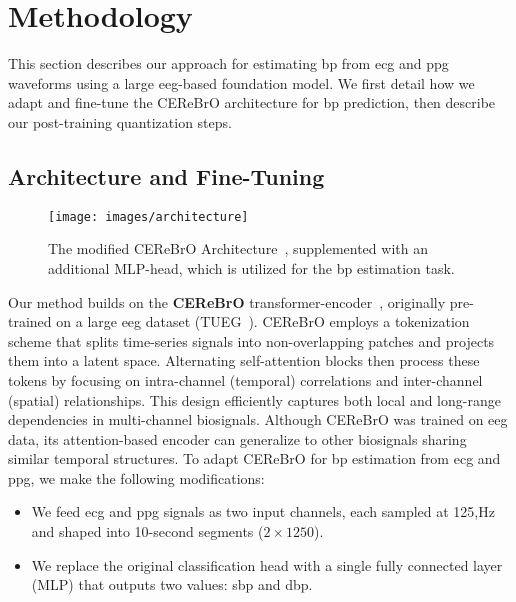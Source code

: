 \section{Methodology}\label{sec:method}

This section describes our approach for estimating \gls{bp} from \gls{ecg} and \gls{ppg} waveforms using a large \gls{eeg}-based foundation model. We first detail how we adapt and fine-tune the CEReBrO architecture for \gls{bp} prediction, then describe our post-training quantization steps.

\subsection{Architecture and Fine-Tuning}\label{subsec:model}

\begin{figure}[htp]
    \centering
    \texttt{[image: images/architecture]}
    \caption{The modified CEReBrO Architecture~\cite{CEReBrO}, supplemented with an additional MLP-head, which is utilized for the \gls{bp} estimation task.} 
    \vspace{-0.6cm}
    \label{fig:cerebro}
\end{figure}  

Our method builds on the \textbf{CEReBrO} transformer-encoder~\cite{CEReBrO}, originally pre-trained on a large \gls{eeg} dataset (TUEG~\cite{TUEG}). CEReBrO employs a tokenization scheme that splits time-series signals into non-overlapping patches and projects them into a latent space. Alternating self-attention blocks then process these tokens by focusing on intra-channel (temporal) correlations and inter-channel (spatial) relationships. This design efficiently captures both local and long-range dependencies in multi-channel biosignals. Although CEReBrO was trained on \gls{eeg} data, its attention-based encoder can generalize to other biosignals sharing similar temporal structures. To adapt CEReBrO for \gls{bp} estimation from \gls{ecg} and \gls{ppg}, we make the following modifications:

\begin{itemize}
    \item We feed \gls{ecg} and \gls{ppg} signals as two input channels, each sampled at 125,Hz and shaped into 10-second segments ($2 \times 1250$).
    \item  We replace the original classification head with a single fully connected layer (MLP) that outputs two values: \gls{sbp} and \gls{dbp}.
\end{itemize}

